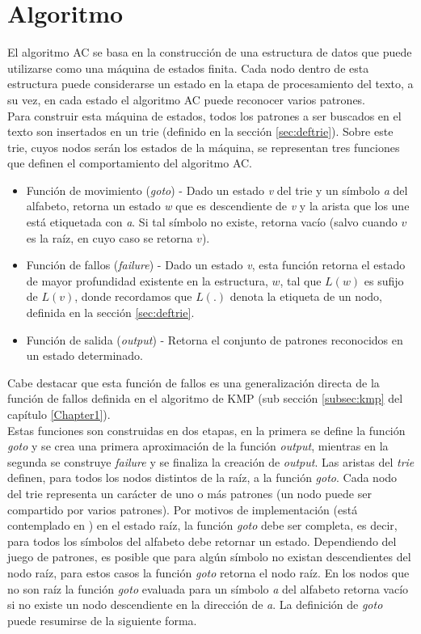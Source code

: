 \section{Algoritmo}
\label{sec:algoritmo_AC}
El algoritmo AC se basa en la construcción de una estructura de datos que puede utilizarse como una máquina de estados finita. Cada nodo dentro de esta estructura puede considerarse un estado en la etapa de procesamiento del texto, a su vez, en cada estado el algoritmo AC puede reconocer varios patrones.\\
Para construir esta máquina de estados, todos los patrones a ser buscados en el texto son insertados en un trie (definido en la sección \ref{sec:deftrie}). Sobre este trie, cuyos nodos serán los estados de la máquina, se representan tres funciones que definen el comportamiento del algoritmo AC. 
\begin{itemize}
\item Función de movimiento ({\it goto}) - Dado un estado {\it v} del trie y un símbolo {\it a} del alfabeto, retorna un estado {\it w} que es descendiente de {\it v} y la arista que los une está etiquetada con {\it a}. Si tal símbolo no existe, retorna vacío (salvo cuando $v$ es la raíz, en cuyo caso se retorna $v$).
\item Función de fallos ({\it failure}) - Dado un estado {\it v}, esta función retorna el estado de mayor profundidad existente en la estructura, $w$, tal que $L(w)$ es sufijo de $L(v)$, donde recordamos que $L(.)$ denota la etiqueta de un nodo, definida en la sección \ref{sec:deftrie}.
\item Función de salida ({\it output}) - Retorna el conjunto de patrones reconocidos en un estado determinado.
\end{itemize}
Cabe destacar que esta función de fallos es una generalización directa de la función de fallos definida en el algoritmo de KMP (sub sección \ref{subsec:kmp} del capítulo \ref{Chapter1}).\\
Estas funciones son construidas en dos etapas, en la primera se define la función {\it goto} y se crea una primera aproximación de la función {\it output}, mientras en la segunda se construye {\it failure} y se finaliza la creación de {\it output}. Las aristas del \emph{trie} definen, para todos los nodos distintos de la raíz, a la función {\it goto}. Cada nodo del trie representa un carácter de uno o más patrones (un nodo puede ser compartido por varios patrones). Por motivos de implementación (está contemplado en \cite{AC75}) en el estado raíz, la función {\it goto} debe ser completa, es decir, para todos los símbolos del alfabeto debe retornar un estado. Dependiendo del juego de patrones, es posible que para algún símbolo no existan descendientes del nodo raíz, para estos casos la función {\it goto} retorna el nodo raíz. En los nodos que no son raíz la función {\it goto} evaluada para un símbolo {\it a} del alfabeto retorna vacío si no existe un nodo descendiente en la dirección de {\it a}. La definición de {\it goto} puede resumirse de la siguiente forma.
